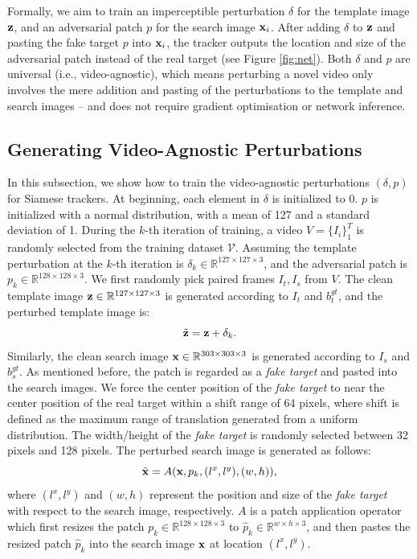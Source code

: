 \documentclass[journal]{IEEEtran}
\newcommand{\ie}{i.e.}
\begin{document}
Formally, we aim to train an imperceptible perturbation $\delta$ for the template image $\textbf z$, and an adversarial patch $p$ for the search image $\textbf x_i$. After adding $\delta$ to $\textbf z$ and pasting the fake target $p$ into $\textbf x_i$, the tracker outputs the location and size of the adversarial patch instead of the real target (see Figure \ref{fig:net}). Both $\delta$ and $p$ are universal (\ie, video-agnostic), which means perturbing a novel video only involves the mere addition and pasting of the perturbations to the template and search images -- and does not require gradient optimisation or network inference.

\subsection{Generating Video-Agnostic Perturbations}

In this subsection, we show how to train the video-agnostic perturbations $(\delta, p)$ for Siamese trackers.
At beginning, each element in $\delta$ is initialized to 0.
$p$ is initialized with a normal distribution, with a mean of 127 and a standard deviation of 1.
During the $k$-th iteration of training, a video $V=\{I_i\}_1^T$ is randomly selected from the training dataset $\mathcal V$. Assuming the template perturbation at the $k$-th iteration is $\delta_k \in \mathbb{R}^{127\times 127 \times 3}$, and the adversarial patch is $p_k \in \mathbb{R}^{128\times 128\times 3}$. We first randomly pick paired frames $I_t, I_s$ from $V$.
The clean template image $\textbf z\in \mathbb{R}^{127\times 127 \times 3}$ is generated according to $I_t$ and $b^{gt}_t$, and the perturbed template image is:
\begin{equation}
\tilde {\textbf z} = \textbf z + \delta_k.
\end{equation}
Similarly, the clean search image $\textbf x \in \mathbb{R}^{303\times 303 \times 3}$ is generated according to $I_s$ and $b^{gt}_s$.
As mentioned before, the patch is regarded as a \textit{fake target} and pasted into the search images. We force the center position of the \textit{fake target} to near the center position of the real target within a shift range of 64 pixels, where shift is defined as the maximum range of translation generated from a uniform distribution.
The width/height of the \textit{fake target} is randomly selected between 32 pixels and 128 pixels.
The perturbed search image is generated as follows:
\begin{equation}
\tilde{\textbf x} = A(\textbf x, p_k, (l^x, l^y), (w, h)),
\end{equation}
where $(l^x, l^y)$ and $(w, h)$ represent the position and size of the \textit{fake target} with respect to the search image, respectively. $A$ is a patch application operator \cite{patch} which first resizes the patch $p_k \in \mathbb{R}^{128\times 128\times 3}$ to $\hat{p}_k \in \mathbb{R}^{w\times h\times 3}$, and then pastes the resized patch $\hat{p}_k$ into the search image $\textbf x$ at location $(l^x,l^y)$.
\end{document}
